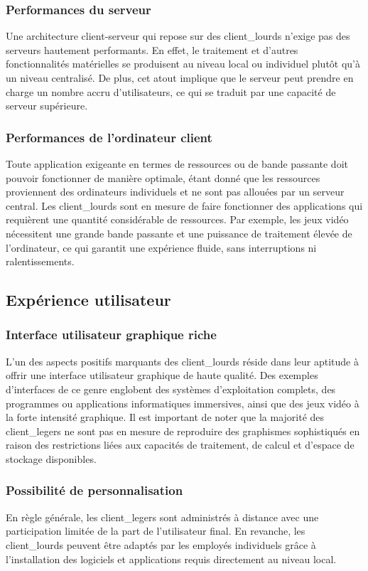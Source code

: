 \documentclass[a4paper, 12pt, french]{article}
\begin{document}
				\subsubsection{Performances du serveur}
					Une architecture client-serveur qui repose sur des \glspl{client_lourd} n'exige pas des serveurs hautement performants. En effet, le traitement et d'autres fonctionnalités matérielles se produisent au niveau local ou individuel plutôt qu'à un niveau centralisé. De plus, cet atout implique que le serveur peut prendre en charge un nombre accru d'utilisateurs, ce qui se traduit par une capacité de serveur supérieure.

				\subsubsection{Performances de l'ordinateur client}
					Toute application exigeante en termes de ressources ou de bande passante doit pouvoir fonctionner de manière optimale, étant donné que les ressources proviennent des ordinateurs individuels et ne sont pas allouées par un serveur central. Les \glspl{client_lourd} sont en mesure de faire fonctionner des applications qui requièrent une quantité considérable de ressources. Par exemple, les jeux vidéo nécessitent une grande bande passante et une puissance de traitement élevée de l'ordinateur, ce qui garantit une expérience fluide, sans interruptions ni ralentissements.
			
			\subsection{Expérience utilisateur}
				\subsubsection{Interface utilisateur graphique riche}
					L'un des aspects positifs marquants des \glspl{client_lourd} réside dans leur aptitude à offrir une interface utilisateur graphique de haute qualité. Des exemples d'interfaces de ce genre englobent des systèmes d'exploitation complets, des programmes ou applications informatiques immersives, ainsi que des jeux vidéo à la forte intensité graphique. Il est important de noter que la majorité des \glspl{client_leger} ne sont pas en mesure de reproduire des graphismes sophistiqués en raison des restrictions liées aux capacités de traitement, de calcul et d'espace de stockage disponibles.
				\newpage
				\subsubsection{Possibilité de personnalisation}
					En règle générale, les \glspl{client_leger} sont administrés à distance avec une participation limitée de la part de l'utilisateur final. En revanche, les \glspl{client_lourd} peuvent être adaptés par les employés individuels grâce à l'installation des logiciels et applications requis directement au niveau local.
			
\end{document}
